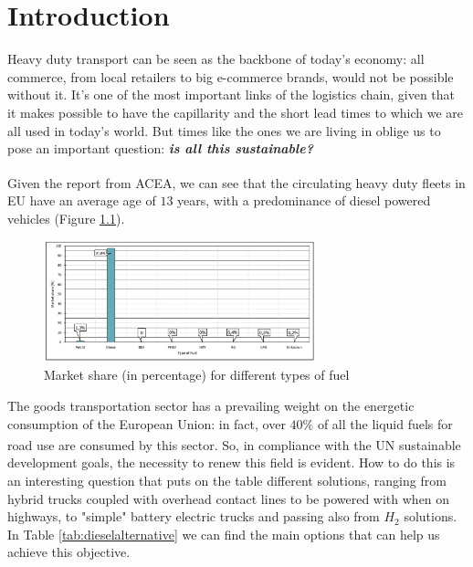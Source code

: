 \newpage
\chapter{Introduction}
Heavy duty transport can be seen as the backbone of today's economy: all commerce, from local retailers to big e-commerce brands, would not be possible without it. It's one of the most important links of the logistics chain, given that it makes possible to have the capillarity and the short lead times to which we are all used in today's world.
But times like the ones we are living in oblige us to pose an important question: \textbf{\textit{is all this sustainable?}}

Given the report from ACEA\textsuperscript{\cite{ACEA2021}}, we can see that the circulating heavy duty fleets in EU have an average age of $13$ years, with a predominance of diesel powered vehicles (Figure \ref{fig:hdpower}).

\begin{figure}[hb]
    \centering
    \includegraphics[width=0.7\textwidth]{Chapters/Pictures/Fuels_MarketShare.jpeg}
    \caption{Market share (in percentage) for different types of fuel}
    \label{fig:hdpower}
\end{figure}

The goods transportation sector has a prevailing weight on the energetic consumption of the European Union: in fact, over $40\%$ of all the liquid fuels for road use are consumed by this sector\textsuperscript{\cite{pianoidrogeno}}. So, in compliance with the UN sustainable development goals, the  necessity to renew this field is evident. How to do this is an interesting question that puts on the table different solutions, ranging from hybrid trucks coupled with overhead contact lines to be powered with when on highways, to "simple" battery electric trucks and passing also from $H_2$ solutions. In Table \ref{tab:dieselalternative} we can find the main options that can help us achieve this objective.

\newpage


